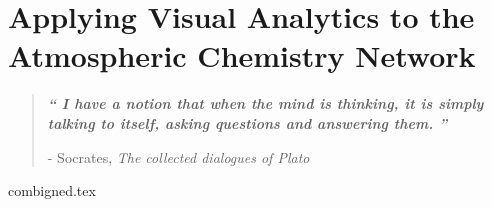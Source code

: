 

\chapter{Applying Visual Analytics to the Atmospheric Chemistry Network}\label{ch2}


\blankpage
\restoregeometry
\vspace*{0.15\paperheight}



\begin{center}
\begin{quotation}
  \large{\emph{\textbf{`` I have a notion that when the mind is thinking, it is simply talking to itself, asking questions and answering them. ''} }  }  \\
  \begin{flushright}
  - Socrates, \textit{The collected dialogues of Plato} 
  \end{flushright}
 \end{quotation}
\end{center}
\doublespacing
\newpage

% 
 
 
{combigned.tex} 

\chapterbib






